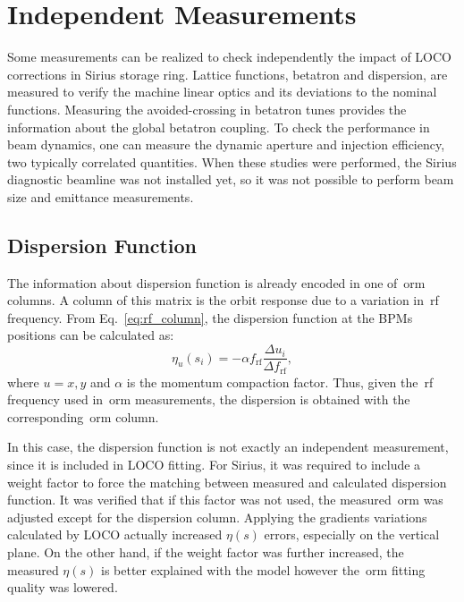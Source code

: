 \section{Independent Measurements}\label{sec:independent_meas}
Some measurements can be realized to check independently the impact of LOCO corrections in Sirius storage ring. Lattice functions, betatron and dispersion, are measured to verify the machine linear optics and its deviations to the nominal functions. Measuring the avoided-crossing in betatron tunes provides the information about the global betatron coupling. To check the performance in beam dynamics, one can measure the dynamic aperture and injection efficiency, two typically correlated quantities. When these studies were performed, the Sirius diagnostic beamline was not installed yet, so it was not possible to perform beam size and emittance measurements.

\subsection{Dispersion Function}
The information about dispersion function is already encoded in one of~\gls{orm} columns. A column of this matrix is the orbit response due to a variation in~\gls{rf} frequency. From Eq.~\eqref{eq:rf_column}, the dispersion function at the BPMs positions can be calculated as:
\begin{equation}
\eta_u(s_i) = -\alpha f_{\mathrm{rf}}\dfrac{\Delta u_i}{ \Delta f_{\mathrm{rf}}},
\end{equation}
where $u=x, y$ and $\alpha$ is the momentum compaction factor. Thus, given the~\gls{rf} frequency used in~\gls{orm} measurements, the dispersion is obtained with the corresponding~\gls{orm} column.

In this case, the dispersion function is not exactly an independent measurement, since it is included in LOCO fitting. For Sirius, it was required to include a weight factor to force the matching between measured and calculated dispersion function. It was verified that if this factor was not used, the measured~\gls{orm} was adjusted except for the dispersion column. Applying the gradients variations calculated by LOCO actually increased $\eta(s)$ errors, especially on the vertical plane. On the other hand, if the weight factor was further increased, the measured $\eta(s)$ is better explained with the model however the~\gls{orm} fitting quality was lowered.


